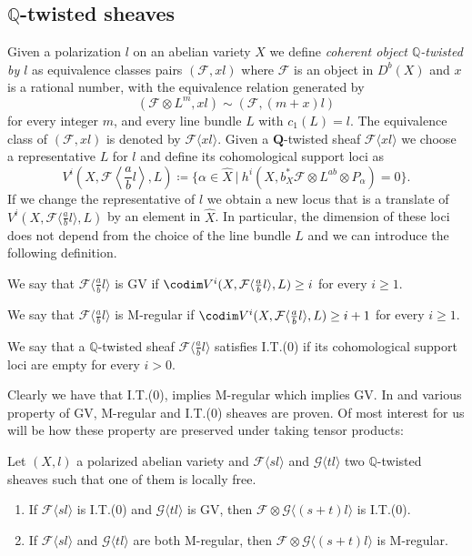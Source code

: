 \documentclass[11pt,letter]{amsart}
\numberwithin{equation}{section}
\begin{document}
\subsection{$\mathbb{Q}$-twisted sheaves}\label{sec2.2}
Given a polarization $l$ on an abelian variety $X$ we define \emph{coherent object $\mathbb{Q}$-twisted by $l$} as equivalence classes pairs $(\mathcal{F}, xl)$ where $\mathcal{F}$ is an object in $D^b(X)$ and $x$ is a rational number, with the equivalence relation generated by
$$
(\mathcal{F}\otimes L^m,xl)\sim(\mathcal{F},(m+x)l)
$$
for every integer $m$, and every line bundle $L$ with $c_1(L)=l$. The equivalence class of $(\mathcal{F},xl)$ is denoted by $\mathcal{F}\langle xl\rangle$. Given a $\mathbf{Q}$-twisted sheaf $\mathcal{F}\langle xl\rangle$ we choose a representative $L$ for $l$ and define its cohomological support loci as
$$
V^i\left(X, \mathcal{F}\left\langle \frac{a}{b}l\right\rangle, L\right)\coloneqq\{  \alpha\in\hat{X}\:|\:h^i(X, b_X^*\mathcal{F}\otimes L^{ab}\otimes P_  \alpha)=0\}.
$$
If we change the representative of $l$ we obtain a new locus that is a translate of $V^i\left(X, \mathcal{F}\langle \frac{a}{b}l\rangle, L\right)$ by an element in $\hat{X}$. In particular, the dimension of these loci does not depend from the choice of the line bundle $L$ and we can introduce the following definition.
\begin{defi}\label{def2.1}
 We say that $\mathcal{F}\langle \frac{a}{b}l\rangle$ is GV if $\codim V^i(X,\mathcal{F}\langle \frac{a}{b}l\rangle, L)\ge i$ for every $i\ge 1$.\par
We say that $\mathcal{F}\langle \frac{a}{b}l\rangle$ is M-regular if $\codim V^i(X,\mathcal{F}\langle \frac{a}{b}l\rangle, L)\ge i+1$ for every $i\ge 1$.\par
We say that a $\mathbb{Q}$-twisted sheaf $\mathcal{F}\langle \frac{a}{b}l\rangle$ satisfies I.T.(0) if its cohomological support loci are empty for every $i>0$. 
\end{defi}
Clearly we have that I.T.(0), implies M-regular which implies GV. In \cite{Caucci} and \cite{Ito22} various property of GV, M-regular and I.T.(0) sheaves are proven. Of most interest for us will be how these property are preserved under taking tensor products:
\begin{prop}\label{caucci}
Let $(X,l)$ a polarized abelian variety and  $\mathcal{F}\langle sl\rangle$ and $\mathcal{G}\langle tl\rangle$ two $\mathbb{Q}$-twisted sheaves such that one of them is locally free.
\begin{enumerate}
\item If $\mathcal{F}\langle sl\rangle$ is I.T.(0) and $\mathcal{G}\langle tl\rangle$ is GV, then $\mathcal{F}\otimes\mathcal{G}\langle(s+t)l\rangle$ is I.T.(0).
\item If $\mathcal{F}\langle sl\rangle$ and $\mathcal{G}\langle tl\rangle$ are both M-regular, then $\mathcal{F}\otimes\mathcal{G}\langle(s+t)l\rangle$ is M-regular.
\end{enumerate}
\end{prop}
\end{document}
